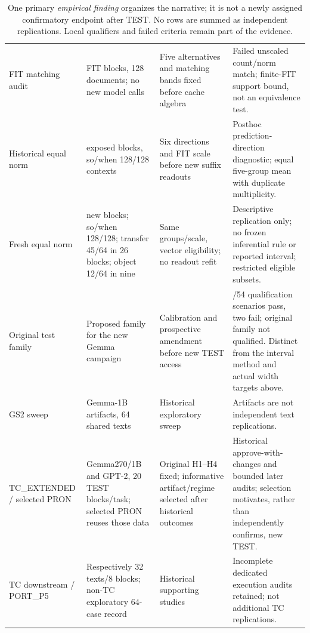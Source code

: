 \begin{table}[ht]
\begin{tabular}{>{\raggedright\arraybackslash}p{}>{\raggedright\arraybackslash}p{}>{\raggedright\arraybackslash}p{}>{\raggedright\arraybackslash}p{}}
FIT matching audit & 32 FIT blocks, 128 documents; no new model calls & Five alternatives and matching bands fixed before cache algebra & Failed unscaled count/norm match; finite-FIT support bound, not an equivalence test.\\[3pt]
Historical equal norm & 32 exposed blocks, so/when 128/128 contexts & Six directions and FIT scale before new suffix readouts & Posthoc prediction-direction diagnostic; equal five-group mean with duplicate multiplicity.\\[3pt]
Fresh equal norm & 32 new blocks; so/when 128/128; transfer 45/64 in 26 blocks; object 12/64 in nine & Same groups/scale, vector eligibility; no readout refit & Descriptive replication only; no frozen inferential rule or reported interval; restricted eligible subsets.\\[3pt]
Original test family & Proposed family for the new Gemma campaign & Calibration and prospective amendment before new TEST access & 52/54 qualification scenarios pass, two fail; original family not qualified. Distinct from the interval method and actual width targets above.\\[3pt]
GS2 sweep & 18 Gemma-1B artifacts, 64 shared texts & Historical exploratory sweep & Artifacts are not independent text replications.\\[3pt]
TC\_EXTENDED / selected PRON & Gemma270/1B and GPT-2, 20 TEST blocks/task; selected PRON reuses those data & Original H1--H4 fixed; informative artifact/regime selected after historical outcomes & Historical approve-with-changes and bounded later audits; selection motivates, rather than independently confirms, new TEST.\\[3pt]
TC downstream / PORT\_P5 & Respectively 32 texts/8 blocks; non-TC exploratory 64-case record & Historical supporting studies & Incomplete dedicated execution audits retained; not additional TC replications.\\\bottomrule
\end{tabular}
\caption{One primary \emph{empirical finding} organizes the narrative; it is not a newly assigned confirmatory endpoint after TEST. No rows are summed as independent replications. Local qualifiers and failed criteria remain part of the evidence.}\label{tab:inferentialmap}
\end{table}
